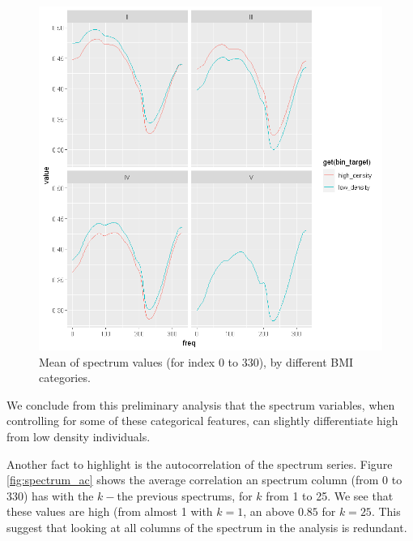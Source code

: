 \documentclass[letterpaper,11pt]{article}
\begin{document}
\begin{figure}[!htb]
	\centering
	\includegraphics[trim={0 0cm 0cm 0}, clip, scale=0.55]{figures/scio_by_color_mean.png}
	\caption{Mean of spectrum values (for index 0 to 330), by different BMI categories.} 
	\label{fig:scio_color_mean}
\end{figure}

We conclude from this preliminary analysis that the spectrum variables, when controlling for some of these categorical features, can slightly differentiate high from low density individuals.

Another fact to highlight is the autocorrelation of the spectrum series. Figure \ref{fig:spectrum_ac} shows the average correlation an spectrum column (from 0 to 330) has with the $k-$the previous spectrums, for $k$ from 1 to 25. We see that these values are high (from almost 1 with $k=1$, an above $0.85$ for $k=25$. This suggest that looking at all columns of the spectrum in the analysis is redundant.
\end{document}
